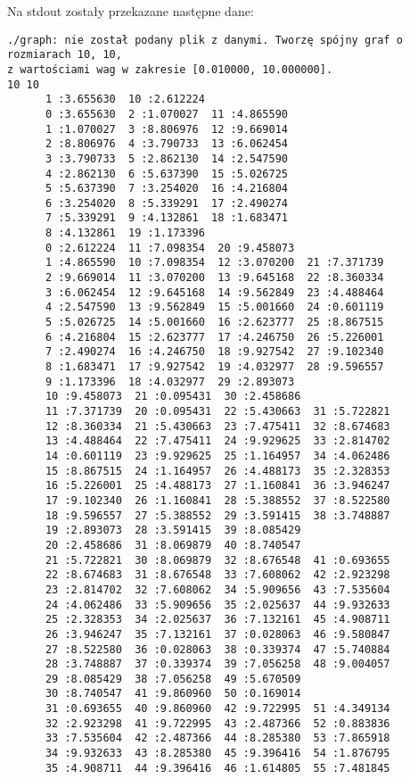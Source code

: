 \documentclass[]{article}
\begin{document}
\begin{itemize}
Na stdout zostały przekazane następne dane:
\begin{verbatim}
./graph: nie został podany plik z danymi. Tworzę spójny graf o rozmiarach 10, 10, 
z wartościami wag w zakresie [0.010000, 10.000000].
10 10
	  1 :3.655630  10 :2.612224
	  0 :3.655630  2 :1.070027  11 :4.865590
	  1 :1.070027  3 :8.806976  12 :9.669014
	  2 :8.806976  4 :3.790733  13 :6.062454
	  3 :3.790733  5 :2.862130  14 :2.547590
	  4 :2.862130  6 :5.637390  15 :5.026725
	  5 :5.637390  7 :3.254020  16 :4.216804
	  6 :3.254020  8 :5.339291  17 :2.490274
	  7 :5.339291  9 :4.132861  18 :1.683471
	  8 :4.132861  19 :1.173396
	  0 :2.612224  11 :7.098354  20 :9.458073
	  1 :4.865590  10 :7.098354  12 :3.070200  21 :7.371739
	  2 :9.669014  11 :3.070200  13 :9.645168  22 :8.360334
	  3 :6.062454  12 :9.645168  14 :9.562849  23 :4.488464
	  4 :2.547590  13 :9.562849  15 :5.001660  24 :0.601119
	  5 :5.026725  14 :5.001660  16 :2.623777  25 :8.867515
	  6 :4.216804  15 :2.623777  17 :4.246750  26 :5.226001
	  7 :2.490274  16 :4.246750  18 :9.927542  27 :9.102340
	  8 :1.683471  17 :9.927542  19 :4.032977  28 :9.596557
	  9 :1.173396  18 :4.032977  29 :2.893073
	  10 :9.458073  21 :0.095431  30 :2.458686
	  11 :7.371739  20 :0.095431  22 :5.430663  31 :5.722821
	  12 :8.360334  21 :5.430663  23 :7.475411  32 :8.674683
	  13 :4.488464  22 :7.475411  24 :9.929625  33 :2.814702
	  14 :0.601119  23 :9.929625  25 :1.164957  34 :4.062486
	  15 :8.867515  24 :1.164957  26 :4.488173  35 :2.328353
	  16 :5.226001  25 :4.488173  27 :1.160841  36 :3.946247
	  17 :9.102340  26 :1.160841  28 :5.388552  37 :8.522580
	  18 :9.596557  27 :5.388552  29 :3.591415  38 :3.748887
	  19 :2.893073  28 :3.591415  39 :8.085429
	  20 :2.458686  31 :8.069879  40 :8.740547
	  21 :5.722821  30 :8.069879  32 :8.676548  41 :0.693655
	  22 :8.674683  31 :8.676548  33 :7.608062  42 :2.923298
	  23 :2.814702  32 :7.608062  34 :5.909656  43 :7.535604
	  24 :4.062486  33 :5.909656  35 :2.025637  44 :9.932633
	  25 :2.328353  34 :2.025637  36 :7.132161  45 :4.908711
	  26 :3.946247  35 :7.132161  37 :0.028063  46 :9.580847
	  27 :8.522580  36 :0.028063  38 :0.339374  47 :5.740884
	  28 :3.748887  37 :0.339374  39 :7.056258  48 :9.004057
	  29 :8.085429  38 :7.056258  49 :5.670509
	  30 :8.740547  41 :9.860960  50 :0.169014
	  31 :0.693655  40 :9.860960  42 :9.722995  51 :4.349134
	  32 :2.923298  41 :9.722995  43 :2.487366  52 :0.883836
	  33 :7.535604  42 :2.487366  44 :8.285380  53 :7.865918
	  34 :9.932633  43 :8.285380  45 :9.396416  54 :1.876795
	  35 :4.908711  44 :9.396416  46 :1.614805  55 :7.481845

\end{verbatim}
\end{itemize}
\end{document}
